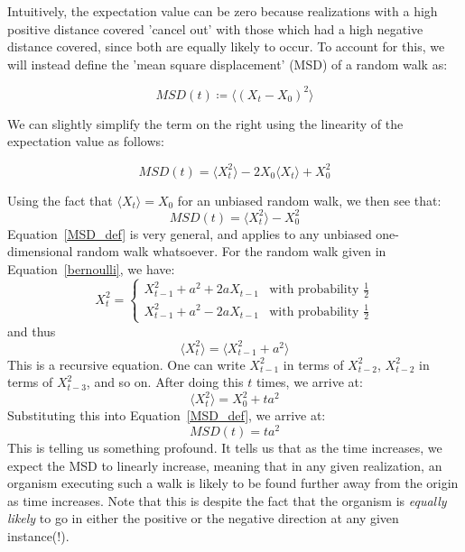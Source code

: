 Intuitively, the expectation value can be zero because realizations with a high positive distance covered 'cancel out' with those which had a high negative distance covered, since both are equally likely to occur. To account for this, we will instead define the 'mean square displacement' (MSD) of a random walk as:

\begin{equation*}
	MSD(t) \coloneqq \big\langle(X_t - X_0)^2\big\rangle 
\end{equation*}

We can slightly simplify the term on the right using the linearity of the expectation value as follows:

\begin{equation}
	\label{general_MSD_def}
	MSD(t) = \big\langle X_{t}^{2}\big\rangle -2X_{0}\big\langle X_{t}\big\rangle + X_{0}^2 
\end{equation}

Using the fact that $\big\langle X_{t}\big\rangle = X_0$ for an unbiased random walk, we then see that:
\begin{equation}
	\label{MSD_def}
	MSD(t) = \big\langle X_{t}^{2}\big\rangle - X_{0}^2
\end{equation}
Equation~\eqref{MSD_def} is very general, and applies to any unbiased one-dimensional random walk whatsoever. For the random walk given in Equation~\eqref{bernoulli}, we have:
\begin{equation*}
	X_{t}^2 = 
	\begin{cases}
		X_{t-1}^2 + a^2 + 2aX_{t-1} & \textrm{with probability } \frac{1}{2}\\
		X_{t-1}^2 + a^2 - 2aX_{t-1} & \textrm{with probability } \frac{1}{2}
	\end{cases}
\end{equation*}
and thus
\begin{equation*}
	\big\langle X_{t}^2\big\rangle = \big\langle X_{t-1}^2+a^2\big\rangle
\end{equation*}
This is a recursive equation. One can write $X_{t-1}^2$ in terms of $X_{t-2}^2$, $X_{t-2}^2$ in terms of $X_{t-3}^2$, and so on. After doing this $t$ times, we arrive at:
\begin{equation*}
	\big\langle X_{t}^2\big\rangle = X_{0}^2 + ta^2
\end{equation*}
Substituting this into Equation~\eqref{MSD_def}, we arrive at:
\begin{equation}
	\label{unbiased_MSD}
	MSD(t) = ta^2
\end{equation}
This is telling us something profound. It tells us that as the time increases, we expect the MSD to linearly increase, meaning that in any given realization, an organism executing such a walk is likely to be found further away from the origin as time increases. Note that this is despite the fact that the organism is \textit{equally likely} to go in either the positive or the negative direction at any given instance(!).

